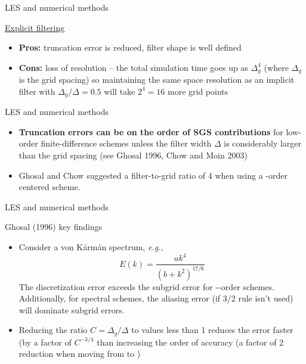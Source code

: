 
\begin{frame}{LES and numerical methods}

\underline{Explicit filtering}
\begin{itemize}
\item \textbf{Pros:} truncation error is reduced, filter shape is well defined
\item \textbf{Cons:} loss of resolution -- the total simulation time goes up as $\Delta_g^4$ (where $\Delta_g$ is the grid spacing) so maintaining the same space resolution as an implicit filter with  $\Delta_g/\Delta = 0.5$ will take $2^4=16$ more grid points
\end{itemize}
\end{frame}


\begin{frame}{LES and numerical methods}

\begin{itemize}
\item \textbf{Truncation errors can be on the order of SGS contributions} for low-order finite-difference schemes unless the filter width $\Delta$ is considerably larger than the grid spacing (see Ghosal 1996, Chow and Moin 2003)
\item Ghosal and Chow suggested a filter-to-grid ratio of 4 when using a -order centered scheme.
\end{itemize}
\end{frame}


\begin{frame}{LES and numerical methods}

Ghosal (1996) key findings
\begin{itemize}
\item Consider a von K\'{a}rm\'{a}n spectrum, \textit{e.g.},
$$E(k) = \frac{ak^4}{(b + k^2)^{17/6}}$$
The discretization error exceeds the subgrid error for --order schemes. Additionally, for spectral schemes, the aliasing error (if 3/2 rule isn’t used) will dominate subgrid errors.

\item Reducing the ratio $C=\Delta_g/\Delta$ to values less than 1 reduces the error faster (by a factor of $C^{-3/4}$ than increasing the order of accuracy (a factor of 2 reduction when moving from  to )
\end{itemize}
\end{frame}

